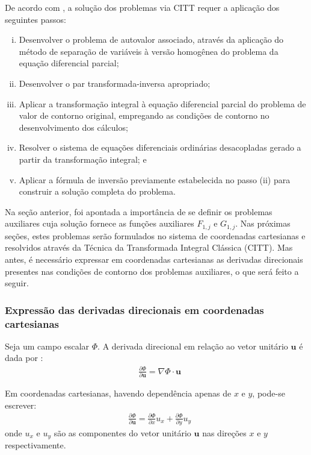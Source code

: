 De acordo com \cite{livro_cotta}, a solução dos problemas via CITT requer a aplicação dos seguintes passos:
\begin{enumerate}[(i)]
	\item Desenvolver o problema de autovalor associado, através da aplicação do método de separação de variáveis à versão homogênea do problema da equação
	diferencial parcial;
	\item Desenvolver o par transformada-inversa apropriado;
	\item Aplicar a transformação integral à equação diferencial parcial do problema de valor de contorno original, empregando as condições de contorno no
	desenvolvimento dos cálculos;
	\item Resolver o sistema de equações diferenciais ordinárias desacopladas gerado a partir da transformação integral; e
	\item Aplicar a fórmula de inversão previamente estabelecida no passo (ii) para construir a solução completa do problema.
\end{enumerate}

Na seção anterior, foi apontada a importância de se definir os problemas auxiliares cuja solução fornece as funções auxiliares $F_{1,j}$ e $G_{1,j}$.
Nas próximas seções, estes problemas serão formulados no sistema de coordenadas cartesianas e resolvidos através da Técnica da Transformada Integral Clássica (CITT). Mas antes, é necessário
expressar em coordenadas cartesianas as derivadas direcionais presentes nas condições de contorno dos problemas auxiliares, o que
será feito a seguir.

\subsubsection{Expressão das derivadas direcionais em coordenadas cartesianas}\label{secao_sobre_normal}
Seja um campo escalar $\Phi$. A derivada direcional em relação ao vetor unitário $\mathbf{u}$ é dada por \citep{livro_stewart_2}:
\begin{align}
& \frac{\partial\Phi}{\partial\mathbf{u}} = \nabla \Phi \cdot \mathbf{u} 
\end{align} 

Em coordenadas cartesianas, havendo dependência apenas de $x$ e $y$, pode-se escrever:
\begin{align}
& \frac{\partial\Phi}{\partial\mathbf{u}} = \frac{\partial \Phi}{\partial x}u_x + \frac{\partial \Phi}{\partial y}u_y\label{derivada_direcional_coodernadas_cartesianas}
\end{align}
onde $u_x$ e $u_y$ são as componentes do vetor unitário $\mathbf{u}$ nas direções $x$ e $y$ respectivamente.

